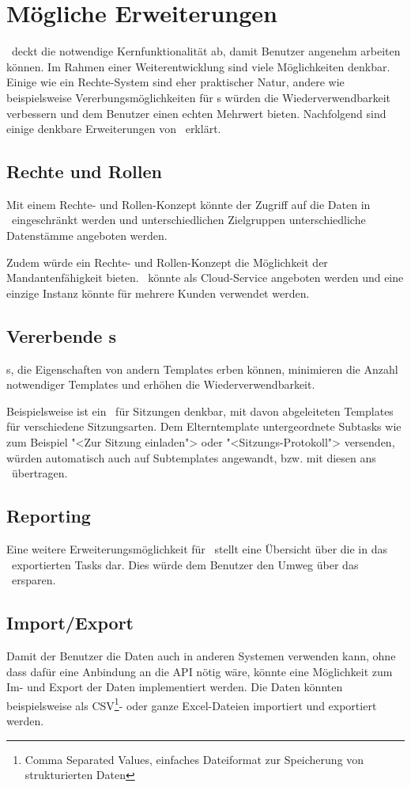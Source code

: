 	\section{Mögliche Erweiterungen}
	\label{sec:possibleExtensions}
		\eeppi\ deckt die notwendige Kernfunktionalität ab, damit Benutzer angenehm arbeiten können.
		Im Rahmen einer Weiterentwicklung sind viele Möglichkeiten denkbar. 
		Einige wie ein Rechte-System sind eher praktischer Natur, 
		andere wie beispielsweise Vererbungsmöglichkeiten für \ttpl s würden die Wiederverwendbarkeit verbessern und dem Benutzer einen echten Mehrwert bieten.
		Nachfolgend sind einige denkbare Erweiterungen von \eeppi\ erklärt.
		
		\subsection{Rechte und Rollen}
			Mit einem Rechte- und Rollen-Konzept könnte der Zugriff auf die Daten in \eeppi\ eingeschränkt werden
			und unterschiedlichen Zielgruppen unterschiedliche Datenstämme angeboten werden.
			
			Zudem würde ein Rechte- und Rollen-Konzept die Möglichkeit der Mandantenfähigkeit bieten.
			\eeppi\ könnte als Cloud-Service angeboten werden und eine einzige Instanz könnte für mehrere Kunden verwendet werden.
			
		
		\subsection{Vererbende \ttpl s}
			\ttpl s, die Eigenschaften von andern Templates erben können, 
			minimieren die Anzahl notwendiger Templates und erhöhen die Wiederverwendbarkeit.
			
			Beispielsweise ist ein \ttpl\ für Sitzungen denkbar, mit
			davon abgeleiteten Templates für verschiedene Sitzungsarten.
			Dem Elterntemplate untergeordnete Subtasks wie zum Beispiel "<Zur Sitzung einladen"> oder "<Sitzungs-Protokoll"> versenden, würden automatisch auch auf Subtemplates angewandt, bzw. mit diesen ans \ppt\ übertragen.
			
		
		\subsection{Reporting}
			Eine weitere Erweiterungsmöglichkeit für \eeppi\ stellt eine Übersicht über die in das \ppt\ exportierten Tasks dar.
			Dies würde dem Benutzer den Umweg über das \ppt\ ersparen.
		
		\subsection{Import/Export}
			Damit der Benutzer die Daten auch in anderen Systemen verwenden kann,
			ohne dass dafür eine Anbindung an die API nötig wäre,
			könnte eine Möglichkeit zum Im- und Export der Daten implementiert werden.
			Die Daten könnten beispielsweise als CSV\footnote{Comma Separated Values, einfaches Dateiformat zur Speicherung von strukturierten Daten}- oder ganze Excel-Dateien importiert und exportiert werden.
		
